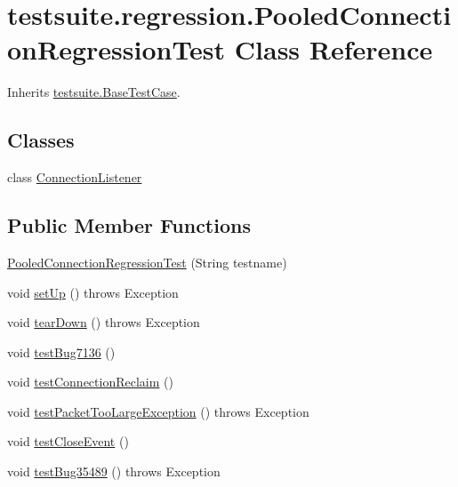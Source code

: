 \hypertarget{classtestsuite_1_1regression_1_1_pooled_connection_regression_test}{}\section{testsuite.\+regression.\+Pooled\+Connection\+Regression\+Test Class Reference}
\label{classtestsuite_1_1regression_1_1_pooled_connection_regression_test}


Inherits \mbox{\hyperlink{classtestsuite_1_1_base_test_case}{testsuite.\+Base\+Test\+Case}}.

\subsection*{Classes}
\begin{DoxyCompactItemize}
\item 
class \mbox{\hyperlink{classtestsuite_1_1regression_1_1_pooled_connection_regression_test_1_1_connection_listener}{Connection\+Listener}}
\end{DoxyCompactItemize}
\subsection*{Public Member Functions}
\begin{DoxyCompactItemize}
\item 
\mbox{\hyperlink{classtestsuite_1_1regression_1_1_pooled_connection_regression_test_a1be54941bd00006c4127b4eac74ea7e5}{Pooled\+Connection\+Regression\+Test}} (String testname)
\item 
void \mbox{\hyperlink{classtestsuite_1_1regression_1_1_pooled_connection_regression_test_a0c76c551e31c7968aa02015599380523}{set\+Up}} ()  throws Exception 
\item 
void \mbox{\hyperlink{classtestsuite_1_1regression_1_1_pooled_connection_regression_test_a7df03569e1b544c6d99eda49fe0fadc5}{tear\+Down}} ()  throws Exception 
\item 
void \mbox{\hyperlink{classtestsuite_1_1regression_1_1_pooled_connection_regression_test_a9eb614f168e80e2ea20ad3f5491eea9f}{test\+Bug7136}} ()
\item 
void \mbox{\hyperlink{classtestsuite_1_1regression_1_1_pooled_connection_regression_test_a1f5f8fe8cb25dbed85e0f3861c971e2f}{test\+Connection\+Reclaim}} ()
\item 
void \mbox{\hyperlink{classtestsuite_1_1regression_1_1_pooled_connection_regression_test_af108f826c529b646621b476cad0672d8}{test\+Packet\+Too\+Large\+Exception}} ()  throws Exception 
\item 
void \mbox{\hyperlink{classtestsuite_1_1regression_1_1_pooled_connection_regression_test_a271d5adc3f09f3483472dc3c7bb7f24b}{test\+Close\+Event}} ()
\item 
void \mbox{\hyperlink{classtestsuite_1_1regression_1_1_pooled_connection_regression_test_ae448a81e77d17829c9e922b7859ef609}{test\+Bug35489}} ()  throws Exception 
\end{DoxyCompactItemize}
